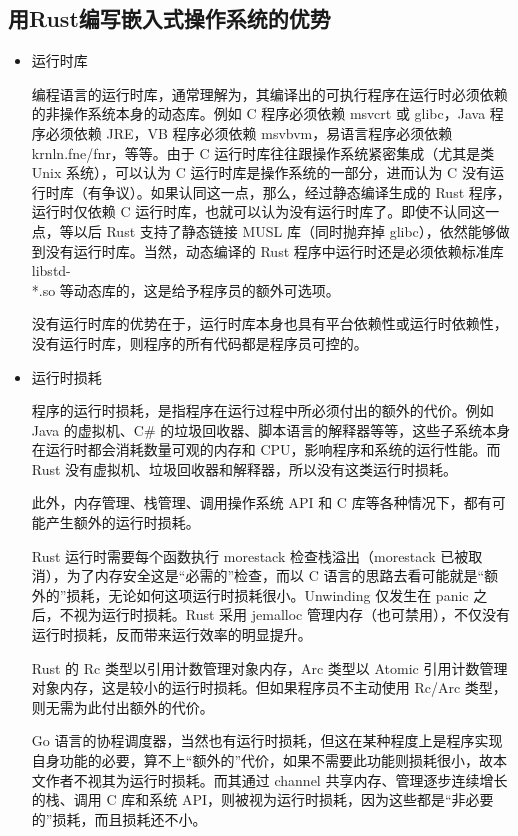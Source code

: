\documentclass[12pt, a4paper]{article}
\begin{document}
	\subsection {用Rust编写嵌入式操作系统的优势}
	\begin{itemize}
	\item 运行时库
	
	编程语言的运行时库，通常理解为，其编译出的可执行程序在运行时必须依赖的非操作系统本身的动态库。例如 C 程序必须依赖 msvcrt 或 glibc，Java 程序必须依赖 JRE，VB 程序必须依赖 msvbvm，易语言程序必须依赖 krnln.fne/fnr，等等。由于 C 运行时库往往跟操作系统紧密集成（尤其是类 Unix 系统），可以认为 C 运行时库是操作系统的一部分，进而认为 C 没有运行时库（有争议）。如果认同这一点，那么，经过静态编译生成的 Rust 程序，运行时仅依赖 C 运行时库，也就可以认为没有运行时库了。即使不认同这一点，等以后 Rust 支持了静态链接 MUSL 库（同时抛弃掉 glibc），依然能够做到没有运行时库。当然，动态编译的 Rust 程序中运行时还是必须依赖标准库 libstd-\\*.so 等动态库的，这是给予程序员的额外可选项。
	
	没有运行时库的优势在于，运行时库本身也具有平台依赖性或运行时依赖性，没有运行时库，则程序的所有代码都是程序员可控的。
	
	\item 运行时损耗
	
	程序的运行时损耗，是指程序在运行过程中所必须付出的额外的代价。例如 Java 的虚拟机、C\# 的垃圾回收器、脚本语言的解释器等等，这些子系统本身在运行时都会消耗数量可观的内存和 CPU，影响程序和系统的运行性能。而 Rust 没有虚拟机、垃圾回收器和解释器，所以没有这类运行时损耗。
	
	此外，内存管理、栈管理、调用操作系统 API 和 C 库等各种情况下，都有可能产生额外的运行时损耗。
	
	Rust 运行时需要每个函数执行 morestack 检查栈溢出（morestack 已被取消），为了内存安全这是“必需的”检查，而以 C 语言的思路去看可能就是“额外的”损耗，无论如何这项运行时损耗很小。Unwinding 仅发生在 panic 之后，不视为运行时损耗。Rust 采用 jemalloc 管理内存（也可禁用），不仅没有运行时损耗，反而带来运行效率的明显提升。
	
	Rust 的 Rc 类型以引用计数管理对象内存，Arc 类型以 Atomic 引用计数管理对象内存，这是较小的运行时损耗。但如果程序员不主动使用 Rc/Arc 类型，则无需为此付出额外的代价。
	
	Go 语言的协程调度器，当然也有运行时损耗，但这在某种程度上是程序实现自身功能的必要，算不上“额外的”代价，如果不需要此功能则损耗很小，故本文作者不视其为运行时损耗。而其通过 channel 共享内存、管理逐步连续增长的栈、调用 C 库和系统 API，则被视为运行时损耗，因为这些都是“非必要的”损耗，而且损耗还不小。
	

\end{itemize}
\end{document}
